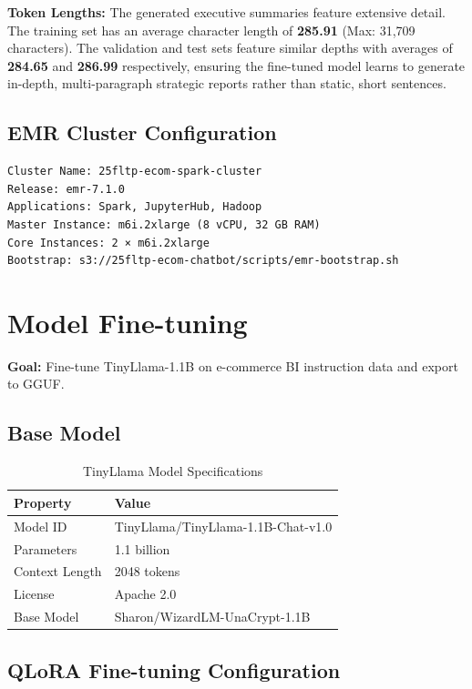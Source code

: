 \documentclass[12pt,a4paper]{article}
\begin{document}
\textbf{Token Lengths:}
The generated executive summaries feature extensive detail. The training set has an average character length of \textbf{285.91} (Max: 31,709 characters). The validation and test sets feature similar depths with averages of \textbf{284.65} and \textbf{286.99} respectively, ensuring the fine-tuned model learns to generate in-depth, multi-paragraph strategic reports rather than static, short sentences.
\subsection{EMR Cluster Configuration}

\begin{verbatim}
Cluster Name: 25fltp-ecom-spark-cluster
Release: emr-7.1.0
Applications: Spark, JupyterHub, Hadoop
Master Instance: m6i.2xlarge (8 vCPU, 32 GB RAM)
Core Instances: 2 × m6i.2xlarge
Bootstrap: s3://25fltp-ecom-chatbot/scripts/emr-bootstrap.sh
\end{verbatim}

\section{Model Fine-tuning}
\label{sec:person2}

\textbf{Goal:} Fine-tune TinyLlama-1.1B on e-commerce BI instruction data and export to GGUF.

\subsection{Base Model}

\begin{table}[h!]
\centering
\caption{TinyLlama Model Specifications}
\begin{tabular}{ll}
\toprule
Property & Value \\
\midrule
Model ID & TinyLlama/TinyLlama-1.1B-Chat-v1.0 \\
Parameters & 1.1 billion \\
Context Length & 2048 tokens \\
License & Apache 2.0 \\
Base Model & Sharon/WizardLM-UnaCrypt-1.1B \\
\bottomrule
\end{tabular}
\end{table}

\subsection{QLoRA Fine-tuning Configuration}
\end{document}
